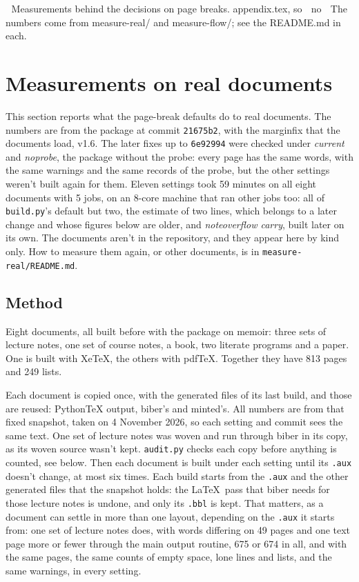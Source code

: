 ^^A Measurements behind the decisions on page breaks.   appendix.tex, so
^^A no %
^^A The numbers come from measure-real/ and measure-flow/; see the README.md in each.

\section{Measurements on real documents}\label{app:pb-measure}

This section reports what the page-break defaults do to real documents.
The numbers are from the package at commit \texttt{21675b2}, with the \textsf{marginfix} that the
documents load, v1.6.
The later fixes up to \texttt{6e92994} were checked under \emph{current} and \emph{noprobe}, the
package without the probe: every page has the same words, with the same warnings and the same records
of the probe, but the other settings weren't built again for them.
Eleven settings took 59 minutes on all eight documents with 5 jobs, on an 8-core machine that ran
other jobs too: all of \texttt{build.py}'s default but two, the estimate of two lines, which belongs
to a later change and whose figures below are older, and \emph{noteoverflow carry}, built later on
its own.
The documents aren't in the repository, and they appear here by kind only.
How to measure them again, or other documents, is in \texttt{measure-real/README.md}.

\subsection{Method}

Eight documents, all built before with the package on \textsf{memoir}: three sets of
lecture notes, one set of course notes, a book, two literate programs and a paper.
One is built with Xe\TeX, the others with pdf\TeX.
Together they have 813 pages and 249 lists.

Each document is copied once, with the generated files of its last build, and those are reused:
PythonTeX output, biber's and minted's.
All numbers are from that fixed snapshot, taken on 4 November 2026, so each setting and commit sees
the same text.
One set of lecture notes was woven and run through biber in its copy, as its woven source wasn't kept.
\texttt{audit.py} checks each copy before anything is counted, see below.
Then each document is built under each setting until its \texttt{.aux} doesn't change, at most six times.
Each build starts from the \texttt{.aux} and the other generated files that the snapshot holds:
the \LaTeX\ pass that biber needs for those lecture notes is undone, and only its \texttt{.bbl} is kept.
That matters, as a document can settle in more than one layout, depending on the \texttt{.aux} it starts
from: one set of lecture notes does, with words differing on 49 pages and one text page more or fewer
through the main output routine, 675 or 674 in all, and with the same pages, the same counts of
empty space, lone lines and lists, and the same warnings, in every setting.

